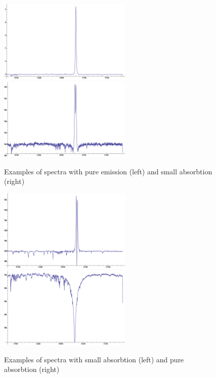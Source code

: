 \documentclass[thesis=B,english]{FITthesis}[2012/10/20]
\begin{document}
\begin{figure}

\includegraphics[width=180pt]{emission_spectrum}
\label{fig:pure_emission}
\quad
\includegraphics[width=180pt]{small_abs_spectrum}
\caption[Examples of spectra with pure emission and small absorbtion]{Examples of spectra with pure emission (left) and small absorbtion (right)}
\label{fig:small_abs}

\end{figure}

\begin{figure}
\centering
\includegraphics[width=180pt]{big_abs_spectrum}
\label{fig:large_abs}
\centering
\includegraphics[width=180pt]{absorbtion_spectrum}
\caption[Examples of spectra with small absorbtion and pure absorbtion]{Examples of spectra with small absorbtion (left) and pure absorbtion (right)}
\label{fig:pure_absrob}

\end{figure}
\end{document}
